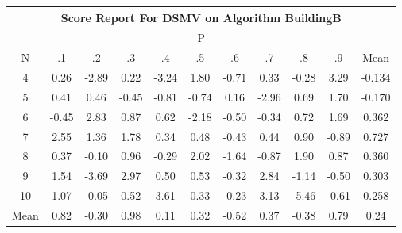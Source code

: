 \documentclass[11pt,a4paper]{report}
\begin{document}
\begin{longtable}{ | c || c | c | c | c | c | c | c | c | c || c |}
\hline
\multicolumn{11}{|c|}{ Score Report For DSMV on Algorithm BuildingB} \\
\hline
\multicolumn{11}{|c|}{ P } \\
\hline
N & .1 & .2 & .3 & .4 & .5 & .6 & .7 & .8 & .9 & Mean\\
 \hline
 \hline
 \endhead
  4 &  \cellcolor[HTML]{F7F7FF} 0.26 &  \cellcolor[HTML]{FFB7B7} -2.89 &  \cellcolor[HTML]{F7F7FF} 0.22 &  \cellcolor[HTML]{FFAFAF} -3.24 &  \cellcolor[HTML]{CFCFFF} 1.80 &  \cellcolor[HTML]{FFEFEF} -0.71 &  \cellcolor[HTML]{F7F7FF} 0.33 &  \cellcolor[HTML]{FFF7F7} -0.28 &  \cellcolor[HTML]{AFAFFF} 3.29 & -0.134 \\
  5 &  \cellcolor[HTML]{F7F7FF} 0.41 &  \cellcolor[HTML]{F7F7FF} 0.46 &  \cellcolor[HTML]{FFF7F7} -0.45 &  \cellcolor[HTML]{FFE7E7} -0.81 &  \cellcolor[HTML]{FFEFEF} -0.74 &  \cellcolor[HTML]{FFFFFF} 0.16 &  \cellcolor[HTML]{FFB7B7} -2.96 &  \cellcolor[HTML]{EFEFFF} 0.69 &  \cellcolor[HTML]{D7D7FF} 1.70 & -0.170 \\
  6 &  \cellcolor[HTML]{FFF7F7} -0.45 &  \cellcolor[HTML]{B7B7FF} 2.83 &  \cellcolor[HTML]{E7E7FF} 0.87 &  \cellcolor[HTML]{EFEFFF} 0.62 &  \cellcolor[HTML]{FFC7C7} -2.18 &  \cellcolor[HTML]{FFEFEF} -0.50 &  \cellcolor[HTML]{FFF7F7} -0.34 &  \cellcolor[HTML]{EFEFFF} 0.72 &  \cellcolor[HTML]{D7D7FF} 1.69 & 0.362 \\
  7 &  \cellcolor[HTML]{BFBFFF} 2.55 &  \cellcolor[HTML]{DFDFFF} 1.36 &  \cellcolor[HTML]{CFCFFF} 1.78 &  \cellcolor[HTML]{F7F7FF} 0.34 &  \cellcolor[HTML]{EFEFFF} 0.48 &  \cellcolor[HTML]{FFF7F7} -0.43 &  \cellcolor[HTML]{F7F7FF} 0.44 &  \cellcolor[HTML]{E7E7FF} 0.90 &  \cellcolor[HTML]{FFE7E7} -0.89 & 0.727 \\
  8 &  \cellcolor[HTML]{F7F7FF} 0.37 &  \cellcolor[HTML]{FFFFFF} -0.10 &  \cellcolor[HTML]{E7E7FF} 0.96 &  \cellcolor[HTML]{FFF7F7} -0.29 &  \cellcolor[HTML]{CFCFFF} 2.02 &  \cellcolor[HTML]{FFD7D7} -1.64 &  \cellcolor[HTML]{FFE7E7} -0.87 &  \cellcolor[HTML]{CFCFFF} 1.90 &  \cellcolor[HTML]{E7E7FF} 0.87 & 0.360 \\
  9 &  \cellcolor[HTML]{D7D7FF} 1.54 &  \cellcolor[HTML]{FF9F9F} -3.69 &  \cellcolor[HTML]{B7B7FF} 2.97 &  \cellcolor[HTML]{EFEFFF} 0.50 &  \cellcolor[HTML]{EFEFFF} 0.53 &  \cellcolor[HTML]{FFF7F7} -0.32 &  \cellcolor[HTML]{B7B7FF} 2.84 &  \cellcolor[HTML]{FFDFDF} -1.14 &  \cellcolor[HTML]{FFEFEF} -0.50 & 0.303 \\
  10 &  \cellcolor[HTML]{E7E7FF} 1.07 &  \cellcolor[HTML]{FFFFFF} -0.05 &  \cellcolor[HTML]{EFEFFF} 0.52 &  \cellcolor[HTML]{A7A7FF} 3.61 &  \cellcolor[HTML]{F7F7FF} 0.33 &  \cellcolor[HTML]{FFF7F7} -0.23 &  \cellcolor[HTML]{AFAFFF} 3.13 &  \cellcolor[HTML]{FF7878} -5.46 &  \cellcolor[HTML]{FFEFEF} -0.61 & 0.258 \\
 \hline
 \hline
Mean &  \cellcolor[HTML]{E7E7FF} 0.82 &  \cellcolor[HTML]{FFF7F7} -0.30 &  \cellcolor[HTML]{E7E7FF} 0.98 &  \cellcolor[HTML]{FFFFFF} 0.11 &  \cellcolor[HTML]{F7F7FF} 0.32 &  \cellcolor[HTML]{FFEFEF} -0.52 &  \cellcolor[HTML]{F7F7FF} 0.37 &  \cellcolor[HTML]{FFF7F7} -0.38 &  \cellcolor[HTML]{E7E7FF} 0.79 &  \cellcolor[HTML]{F7F7FF} 0.24
\end{longtable}
\end{document}
